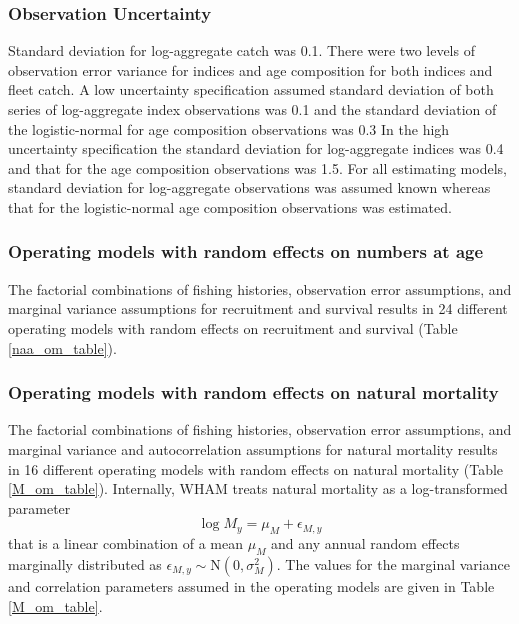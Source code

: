 \documentclass[
  12pt,
]{article}
\begin{document}
\hypertarget{observation-uncertainty}{%
\subsubsection*{Observation Uncertainty}\label{observation-uncertainty}}

Standard deviation for log-aggregate catch was 0.1. There were two
levels of observation error variance for indices and age composition for
both indices and fleet catch. A low uncertainty specification assumed
standard deviation of both series of log-aggregate index observations
was 0.1 and the standard deviation of the logistic-normal for age
composition observations was 0.3 In the high uncertainty specification
the standard deviation for log-aggregate indices was 0.4 and that for
the age composition observations was 1.5. For all estimating models,
standard deviation for log-aggregate observations was assumed known
whereas that for the logistic-normal age composition observations was
estimated.

\hypertarget{operating-models-with-random-effects-on-numbers-at-age}{%
\subsubsection*{Operating models with random effects on numbers at
age}\label{operating-models-with-random-effects-on-numbers-at-age}}

The factorial combinations of fishing histories, observation error
assumptions, and marginal variance assumptions for recruitment and
survival results in 24 different operating models with random effects on
recruitment and survival (Table \ref{naa_om_table}).

\hypertarget{operating-models-with-random-effects-on-natural-mortality}{%
\subsubsection*{Operating models with random effects on natural
mortality}\label{operating-models-with-random-effects-on-natural-mortality}}

The factorial combinations of fishing histories, observation error
assumptions, and marginal variance and autocorrelation assumptions for
natural mortality results in 16 different operating models with random
effects on natural mortality (Table \ref{M_om_table}). Internally, WHAM
treats natural mortality as a log-transformed parameter \[
\log M_y = \mu_M + \epsilon_{M,y}
\] that is a linear combination of a mean \(\mu_M\) and any annual
random effects marginally distributed as
\(\epsilon_{M,y} \sim \text{N}\left(0,\sigma_M^2\right)\). The values
for the marginal variance and correlation parameters assumed in the
operating models are given in Table \ref{M_om_table}.
\end{document}
